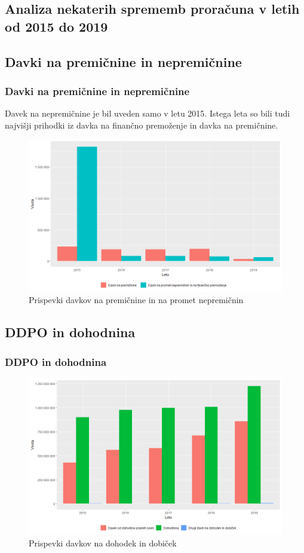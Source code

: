 \documentclass[10pt]{beamer}
\begin{document}
\begin{frame}
	\section[Analiza nekaterih sprememb proračuna v letih od 2015 do 2019]{Analiza nekaterih sprememb proračuna v letih od 2015 do 2019}
	\subsection[Davki na premičnine in nepremičnine]{Davki na premičnine in nepremičnine}
	\frametitle{Davki na premičnine in nepremičnine}
	Davek na nepremičnine je bil uveden samo v letu 2015. Istega leta so bili tudi najvišji prihodki iz davka na finančno premoženje in davka na premičnine.
	\begin{figure}[h!]
	\centering
	\includegraphics[width = 10 cm]{davki_na_premozenje_graf.png}
	\caption{Prispevki davkov na premičnine in na promet nepremičnin}
	\label{Slika 1}
	\end{figure}
\end {frame}

\begin{frame}
	\subsection[DDPO in dohodnina]{DDPO in dohodnina}
	\frametitle{DDPO in dohodnina}
	\begin{figure}[h!]
	\centering
	\includegraphics[width = 10 cm]{davki_na_dohodek_in_dobicek_graf.png}
	\caption{Prispevki davkov na dohodek in dobiček}
	\label{Slika 2}
	\end{figure}
\end {frame}
\end{document}
